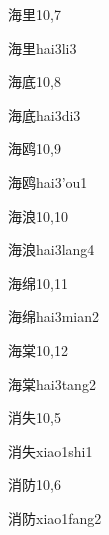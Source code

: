 \begin{entry}{海里}{10,7}
  \begin{phonetics}{海里}{hai3li3}
  \end{phonetics}
\end{entry}

\begin{entry}{海底}{10,8}
  \begin{phonetics}{海底}{hai3di3}
  \end{phonetics}
\end{entry}

\begin{entry}{海鸥}{10,9}
  \begin{phonetics}{海鸥}{hai3'ou1}
  \end{phonetics}
\end{entry}

\begin{entry}{海浪}{10,10}
  \begin{phonetics}{海浪}{hai3lang4}
  \end{phonetics}
\end{entry}

\begin{entry}{海绵}{10,11}
  \begin{phonetics}{海绵}{hai3mian2}
  \end{phonetics}
\end{entry}

\begin{entry}{海棠}{10,12}
  \begin{phonetics}{海棠}{hai3tang2}
  \end{phonetics}
\end{entry}

\begin{entry}{消失}{10,5}
  \begin{phonetics}{消失}{xiao1shi1}
  \end{phonetics}
\end{entry}

\begin{entry}{消防}{10,6}
  \begin{phonetics}{消防}{xiao1fang2}
  \end{phonetics}
\end{entry}

